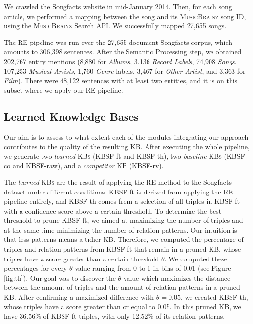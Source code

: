 We crawled the Songfacts website in mid-January 2014. Then, for each song article, we performed a mapping between the song and its \textsc{MusicBrainz} song ID, using the \textsc{MusicBrainz} Search API. We successfully mapped 27,655 songs.

The \textsc{RE} pipeline was run over the 27,655 document Songfacts corpus, which amounts to 306,398 sentences. After the Semantic Processing step, we obtained 202,767 entity mentions (8,880 for \textit{Albums}, 3,136 \textit{Record Labels}, 74,908 \textit{Songs}, 107,253 \textit{Musical Artists}, 1,760 \textit{Genre} labels, 3,467 for \textit{Other Artist}, and 3,363 for \textit{Film}). There were 48,122 sentences with at least two entities, and it is on this subset where we apply our RE pipeline.


\subsection{Learned Knowledge Bases}
\label{sec:learnedkbs}

Our aim is to assess to what extent each of the modules integrating our approach contributes to the quality of the resulting \textsc{KB}. After executing the whole pipeline, we generate two \textit{learned} \textsc{KBs} (\textsc{KBSF}-ft and \textsc{KBSF}-th), two \textit{baseline} \textsc{KBs} (\textsc{KBSF}-co and \textsc{KBSF}-raw), and a \textit{competitor} \textsc{KB} (\textsc{KBSF}-rv). 

The \textit{learned} \textsc{KBs} are the result of applying the \textsc{RE} method to the Songfacts dataset under different conditions. \textsc{KBSF}-ft is derived from applying the \textsc{RE} pipeline entirely, and \textsc{KBSF}-th comes from a selection of all triples in \textsc{KBSF}-ft with a confidence score above a certain threshold. To determine the best threshold to prune \textsc{KBSF}-ft, we aimed at maximizing the number of triples and at the same time minimizing the number of relation patterns. Our intuition is that less patterns means a tidier \textsc{KB}. Therefore, we computed the percentage of triples and relation patterns from \textsc{KBSF}-ft that remain in a pruned \textsc{KB}, whose triples have a score greater than a certain threshold $\theta$. We computed these percentages for every $\theta$ value ranging from 0 to 1 in bins of 0.01 (see Figure \ref{fig:th}). Our goal was to discover the $\theta$ value which maximizes the distance between the amount of triples and the amount of relation patterns in a pruned \textsc{KB}. After confirming a maximized difference with $\theta=0.05$, we created \textsc{KBSF}-th, whose triples have a score greater than or equal to 0.05. In this pruned \textsc{KB}, we have 36.56\% of \textsc{KBSF}-ft triples, with only 12.52\% of its relation patterns.

